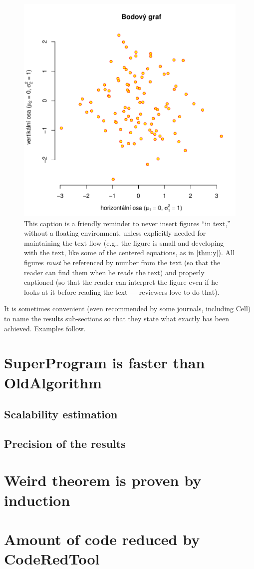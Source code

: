 \begin{figure}
\centering
\includegraphics[width=.6\linewidth]{img/ukazka-obr01.pdf}
\caption{This caption is a friendly reminder to never insert figures ``in text,'' without a floating environment, unless explicitly needed for maintaining the text flow (e.g., the figure is small and developing with the text, like some of the centered equations, as in \cref{thm:y}). All figures \emph{must} be referenced by number from the text (so that the reader can find them when he reads the text) and properly captioned (so that the reader can interpret the figure even if he looks at it before reading the text --- reviewers love to do that).}
\label{fig:f}
\end{figure}

It is sometimes convenient (even recommended by some journals, including Cell) to name the results sub-sections so that they state what exactly has been achieved. Examples follow.

\section{SuperProgram is faster than OldAlgorithm}
\subsection{Scalability estimation}
\subsection{Precision of the results}
\section{Weird theorem is proven by induction}
\section{Amount of code reduced by CodeRedTool}
